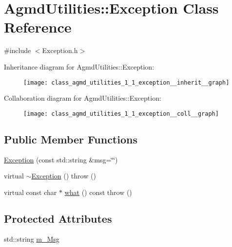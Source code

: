 \hypertarget{class_agmd_utilities_1_1_exception}{\section{Agmd\+Utilities\+:\+:Exception Class Reference}
\label{class_agmd_utilities_1_1_exception}
}


{\ttfamily \#include $<$Exception.\+h$>$}



Inheritance diagram for Agmd\+Utilities\+:\+:Exception\+:\nopagebreak
\begin{figure}[H]
\begin{center}
\leavevmode
\texttt{[image: class\_agmd\_utilities\_1\_1\_exception\_\_inherit\_\_graph]}
\end{center}
\end{figure}


Collaboration diagram for Agmd\+Utilities\+:\+:Exception\+:\nopagebreak
\begin{figure}[H]
\begin{center}
\leavevmode
\texttt{[image: class\_agmd\_utilities\_1\_1\_exception\_\_coll\_\_graph]}
\end{center}
\end{figure}
\subsection*{Public Member Functions}
\begin{DoxyCompactItemize}
\item 
\hyperlink{class_agmd_utilities_1_1_exception_a75919875cf973e497d52b1752d887a7c}{Exception} (const std\+::string \&msg=\char`\"{}\char`\"{})
\item 
virtual \hyperlink{class_agmd_utilities_1_1_exception_ac1f378c2fb0bbe5df5408a28edc8d60a}{$\sim$\+Exception} ()  throw ()
\item 
virtual const char $\ast$ \hyperlink{class_agmd_utilities_1_1_exception_abf8a98e63b743ad521252b61a3517332}{what} () const   throw ()
\end{DoxyCompactItemize}
\subsection*{Protected Attributes}
\begin{DoxyCompactItemize}
\item 
std\+::string \hyperlink{class_agmd_utilities_1_1_exception_a49fb67869a512d55103f01cfe2393eea}{m\+\_\+\+Msg}
\end{DoxyCompactItemize}


